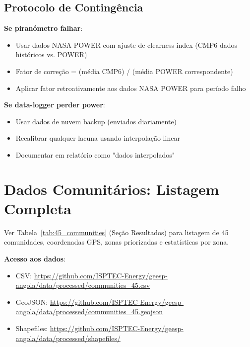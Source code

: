 \documentclass[12pt, a4paper]{article}
\begin{document}
\subsection{Protocolo de Contingência}

\textbf{Se piranómetro falhar}:
\begin{itemize}
\item Usar dados NASA POWER com ajuste de clearness index (CMP6 dados históricos vs. POWER)
\item Fator de correção = (média CMP6) / (média POWER correspondente)
\item Aplicar fator retroativamente aos dados NASA POWER para período falho
\end{itemize}

\textbf{Se data-logger perder power}:
\begin{itemize}
\item Usar dados de nuvem backup (enviados diariamente)
\item Recalibrar qualquer lacuna usando interpolação linear
\item Documentar em relatório como "dados interpolados"
\end{itemize}

\section{Dados Comunitários: Listagem Completa}
\label{app:community_data}

Ver Tabela~\ref{tab:45_communities} (Seção Resultados) para listagem de 45 comunidades, coordenadas GPS, zonas priorizadas e estatísticas por zona.

\textbf{Acesso aos dados}:
\begin{itemize}
\item CSV: \url{https://github.com/ISPTEC-Energy/geesp-angola/data/processed/communities_45.csv}
\item GeoJSON: \url{https://github.com/ISPTEC-Energy/geesp-angola/data/processed/communities_45.geojson}
\item Shapefiles: \url{https://github.com/ISPTEC-Energy/geesp-angola/data/processed/shapefiles/}
\end{itemize}
\end{document}
